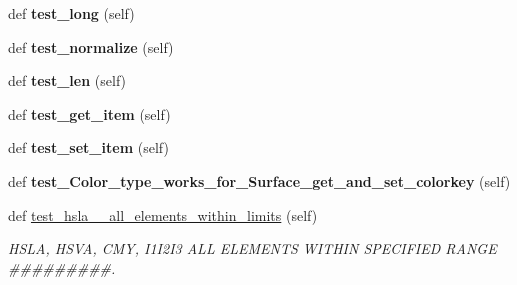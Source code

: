 \begin{DoxyCompactItemize}
def {\bfseries test\+\_\+long} (self)
\item 
\mbox{\label{classpygame_1_1tests_1_1color__test_1_1_color_type_test_aa5656ad4eea26b5986c34958ea91b4b1}} 
def {\bfseries test\+\_\+normalize} (self)
\item 
\mbox{\label{classpygame_1_1tests_1_1color__test_1_1_color_type_test_a8ca956afb3073d656252957ddf43da61}} 
def {\bfseries test\+\_\+len} (self)
\item 
\mbox{\label{classpygame_1_1tests_1_1color__test_1_1_color_type_test_a1342c15b0738dd4c191dddf9cff3bd37}} 
def {\bfseries test\+\_\+get\+\_\+item} (self)
\item 
\mbox{\label{classpygame_1_1tests_1_1color__test_1_1_color_type_test_a085bab2e9e376a5fac7b68f5b164db86}} 
def {\bfseries test\+\_\+set\+\_\+item} (self)
\item 
\mbox{\label{classpygame_1_1tests_1_1color__test_1_1_color_type_test_aefb05a95c1805de4da802213d470f12b}} 
def {\bfseries test\+\_\+\+Color\+\_\+type\+\_\+works\+\_\+for\+\_\+\+Surface\+\_\+get\+\_\+and\+\_\+set\+\_\+colorkey} (self)
\item 
\mbox{\label{classpygame_1_1tests_1_1color__test_1_1_color_type_test_a226ebb6333bb4c134cd0d9c6fe42763c}} 
def \hyperlink{classpygame_1_1tests_1_1color__test_1_1_color_type_test_a226ebb6333bb4c134cd0d9c6fe42763c}{test\+\_\+hsla\+\_\+\+\_\+all\+\_\+elements\+\_\+within\+\_\+limits} (self)
\begin{DoxyCompactList}\small\item\em H\+S\+LA, H\+S\+VA, C\+MY, I1\+I2\+I3 A\+LL E\+L\+E\+M\+E\+N\+TS W\+I\+T\+H\+IN S\+P\+E\+C\+I\+F\+I\+ED R\+A\+N\+GE \#\#\#\#\#\#\#\#\#. \end{DoxyCompactList}\item 
\mbox{\label{classpygame_1_1tests_1_1color__test_1_1_color_type_test_a727af4816fd41ba56112d265305970d2}} 

\end{DoxyCompactItemize}
